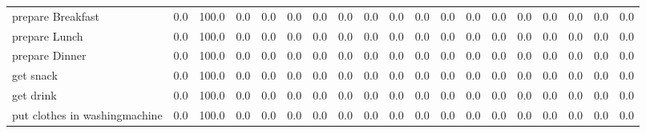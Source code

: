 \documentclass{article}
\begin{document}
\begin{sideways}
\begin{tabular}{lrrrrrrrrrrrrrrrrrr}
prepare Breakfast             &         0.0 &              100.0 &           0.0 &                          0.0 &                0.0 &                0.0 &                        0.0 &          0.0 &              0.0 &                0.0 &                    0.0 &                      0.0 &                  0.0 &                   0.0 &              0.0 &              0.0 &                                  0.0 &          0.0 \\
prepare Lunch                 &         0.0 &              100.0 &           0.0 &                          0.0 &                0.0 &                0.0 &                        0.0 &          0.0 &              0.0 &                0.0 &                    0.0 &                      0.0 &                  0.0 &                   0.0 &              0.0 &              0.0 &                                  0.0 &          0.0 \\
prepare Dinner                &         0.0 &              100.0 &           0.0 &                          0.0 &                0.0 &                0.0 &                        0.0 &          0.0 &              0.0 &                0.0 &                    0.0 &                      0.0 &                  0.0 &                   0.0 &              0.0 &              0.0 &                                  0.0 &          0.0 \\
get snack                     &         0.0 &              100.0 &           0.0 &                          0.0 &                0.0 &                0.0 &                        0.0 &          0.0 &              0.0 &                0.0 &                    0.0 &                      0.0 &                  0.0 &                   0.0 &              0.0 &              0.0 &                                  0.0 &          0.0 \\
get drink                     &         0.0 &              100.0 &           0.0 &                          0.0 &                0.0 &                0.0 &                        0.0 &          0.0 &              0.0 &                0.0 &                    0.0 &                      0.0 &                  0.0 &                   0.0 &              0.0 &              0.0 &                                  0.0 &          0.0 \\
put clothes in washingmachine &         0.0 &              100.0 &           0.0 &                          0.0 &                0.0 &                0.0 &                        0.0 &          0.0 &              0.0 &                0.0 &                    0.0 &                      0.0 &                  0.0 &                   0.0 &              0.0 &              0.0 &                                  0.0 &          0.0 \\

\end{tabular}
\end{sideways}
\end{document}
